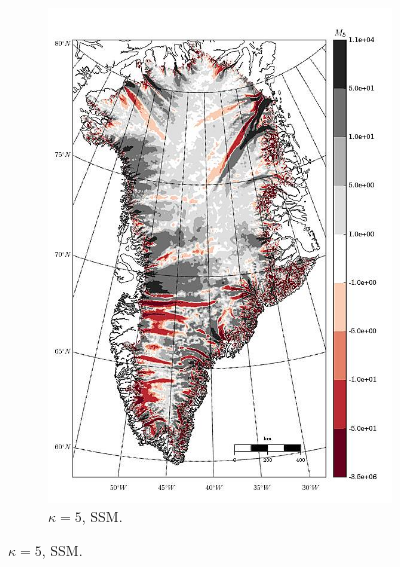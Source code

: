 \begin{figure}
\begin{subfigure}[b]{0.25\linewidth}
    \includegraphics[width=\linewidth]{images/balance_velocity/greenland/d_U_ob/misfit_5H_kappa_5_SSM.jpg}
  \caption{$\kappa = 5$, SSM.}
  \label{greenland_bv_image_d_U_ob_kappa_5_SSM_misfit}
  \end{subfigure}


\end{figure}
